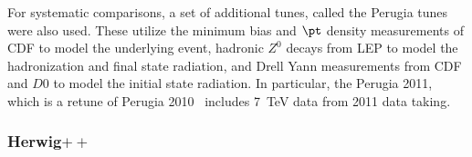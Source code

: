 For systematic comparisons, a set of additional tunes, called the Perugia tunes~\cite{Perugia} were also used. These utilize the minimum bias and $\pt$ density measurements of CDF to model the underlying event, hadronic $Z^0$ decays from LEP to model the hadronization and final state radiation, and Drell Yann measurements from CDF and $D0$ to model the initial state radiation.  In particular, the Perugia 2011, which is a retune of Perugia 2010~\cite{Perugia2010} includes 7~TeV data from 2011 data taking.



\subsubsection{Herwig$++$}


